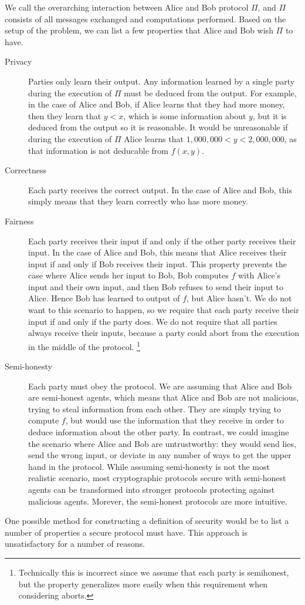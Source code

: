 We call the overarching interaction between Alice and Bob protocol $\Pi$, and $\Pi$ consists of all messages exchanged and computations performed.
Based on the setup of the problem, we can list a few properties that Alice and Bob wish $\Pi$ to have.
\begin{description}
    \item[Privacy] 
        Parties only learn their output. 
        Any information learned by a single party during the execution of $\Pi$ must be deduced from the output. 
        For example, in the case of Alice and Bob, if Alice learns that they had more money, then they learn that $y < x$, which is some information about $y$, but it is deduced from the output so it is reasonable. 
        It would be unreasonable if during the execution of $\Pi$ Alice learns that $1,000,000 < y < 2,000,000$, as that information is not deducable from $f(x,y)$.
    \item[Correctness] 
        Each party receives the correct output.
        In the case of Alice and Bob, this simply means that they learn correctly who has more money.
    \item[Fairness] 
        Each party receives their input if and only if the other party receives their input.
        In the case of Alice and Bob, this means that Alice receives their input if and only if Bob receives their input.
        This property prevents the case where Alice sends her input to Bob, Bob computes $f$ with Alice's input and their own input, and then Bob refuses to send their input to Alice. 
        Hence Bob has learned to output of $f$, but Alice hasn't. 
        We do not want to this scenario to happen, so we require that each party receive their input if and only if the party does. 
        We do not require that all parties always receive their inputs, because a party could abort from the execution in the middle of the protocol.
        \footnote{Technically this is incorrect since we assume that each party is semihonest, but the property generalizes more easily when this requirement when considering aborts.}
    \item[Semi-honesty]
        Each party must obey the protocol.
        We are assuming that Alice and Bob are semi-honest agents, which means that Alice and Bob are not malicious, trying to steal information from each other. 
        They are simply trying to compute $f$, but would use the information that they receive in order to deduce information about the other party.
        In contrast, we could imagine the scenario where Alice and Bob are untrustworthy: they would send lies, send the wrong input, or deviate in any number of ways to get the upper hand in the protocol.
        While assuming semi-honesty is not the most realistic scenario, most cryptographic protocols secure with semi-honest agents can be transformed into stronger protocols protecting against malicious agents.
        Morever, the semi-honest protocols are more intuitive.
\end{description}
One possible method for constructing a definition of security would be to list a number of properties a secure protocol must have.
This approach is unsatisfactory for a number of reasons.

